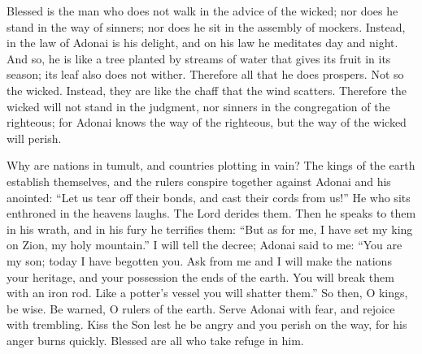 
\begin{biblechapter} %
 Blessed is the man who does not walk in the advice of the wicked; 
nor does he stand in the way of sinners; 
nor does he sit in the assembly of mockers.
\verse Instead, in the law of Adonai is his delight, 
and on his law he meditates day and night.
\verse And so, he is like a tree planted by streams of water 
that gives its fruit in its season; 
its leaf also does not wither. 
Therefore all that he does prospers.
\verse Not so the wicked. 
Instead, they are like the chaff that the wind scatters.
\verse Therefore the wicked will not stand in the judgment, 
nor sinners in the congregation of the righteous;
\verse for Adonai knows the way of the righteous, 
but the way of the wicked will perish.
\end{biblechapter}

\begin{biblechapter} %
 Why are nations in tumult, 
and countries plotting in vain?
\verse The kings of the earth establish themselves, 
and the rulers conspire together 
against Adonai and his anointed:
\verse “Let us tear off their bonds, 
and cast their cords from us!”
\verse He who sits enthroned in the heavens laughs. 
The Lord derides them.
\verse Then he speaks to them in his wrath, 
and in his fury he terrifies them:
\verse “But as for me, I have set my king 
on Zion, my holy mountain.”
\verse I will tell the decree; 
Adonai said to me: 
“You are my son; 
today I have begotten you.
\verse Ask from me and I will make the nations your heritage, 
and your possession the ends of the earth.
\verse You will break them with an iron rod. 
Like a potter’s vessel you will shatter them.”
\verse So then, O kings, be wise. 
Be warned, O rulers of the earth.
\verse Serve Adonai with fear, 
and rejoice with trembling.
\verse Kiss the Son 
lest he be angry and you perish on the way, 
for his anger burns quickly. 
Blessed are all who take refuge in him.
\end{biblechapter}

